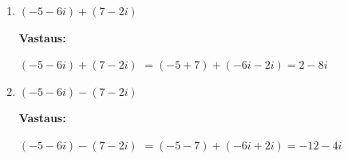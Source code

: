 \documentclass[a4paper,12pt]{article}
\begin{document}
\begin{enumerate}
\begin{enumerate}
    $(3+7i)-(8+2i)$
    $= (3-8) + (7i-2i) =-5+5i$\vspace{1em}
    
    \item $(-5-6i)+(7-2i)$\vspace{1em}
    
    \textbf{Vastaus:}
    
    $(-5-6i)+(7-2i)$
    $=(-5+7)+(-6i-2i)=2-8i $\vspace{1em}
    
    \item $(-5-6i)-(7-2i)$\vspace{1em}

    \textbf{Vastaus:}
    
    $(-5-6i)-(7-2i)$
    $= (-5-7)+(-6i+2i)=-12-4i$\vspace{1em}
    
\end{enumerate}
\end{enumerate}
\end{document}
